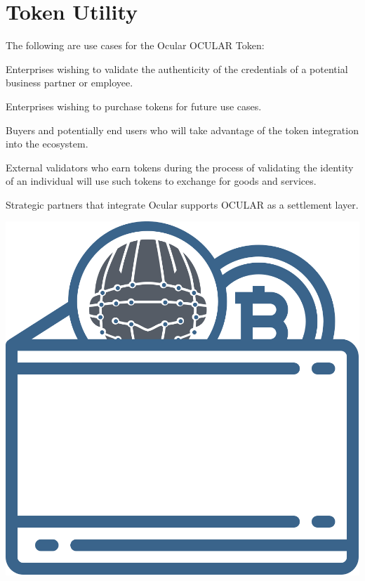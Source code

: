 \documentclass[a4paper]{article}
\let\tempone\itemize
\let\temptwo\enditemize
\renewenvironment{itemize}{\tempone\addtolength{\itemsep}{-5pt}}{\temptwo}
\begin{document}
\section{Token Utility}
The following are use cases for the Ocular OCULAR Token: 
\begin{itemize}
  \item Enterprises wishing to validate the authenticity of the credentials of a potential business partner or employee.
  \item Enterprises wishing to purchase tokens for future use cases.
  \item Buyers and potentially end users who will take advantage of the token integration into the ecosystem.
  \item External validators who earn tokens during the process of validating the identity of an individual will use such tokens to exchange for goods and services.
  \item Strategic partners that integrate Ocular supports OCULAR as a settlement layer. 
\end{itemize}


\centerline{\includegraphics[width=1.0\textwidth]{ocular-ewallet}}
\end{document}
